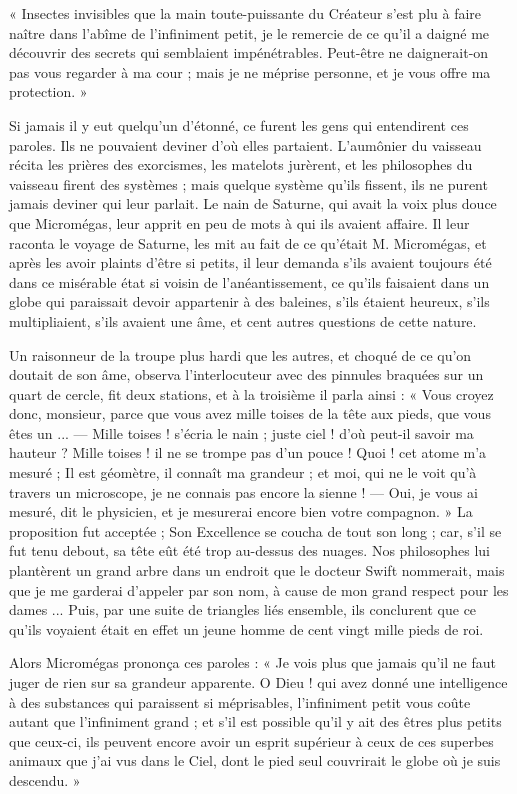 \documentclass[a4paper, 11pt, oneside]{article}
\begin{document}
« Insectes invisibles que la main toute-puissante du Créateur s'est plu à faire naître dans l'abîme de l'infiniment petit, je le remercie de ce qu'il a daigné me découvrir des secrets qui semblaient impénétrables. Peut-être ne daignerait-on pas vous regarder à ma cour ; mais je ne méprise personne, et je vous offre ma protection. »

Si jamais il y eut quelqu'un d'étonné, ce furent les gens qui entendirent ces paroles. Ils ne pouvaient deviner d'où elles partaient. L'aumônier du vaisseau récita les prières des exorcismes, les matelots jurèrent, et les philosophes du vaisseau firent des systèmes ; mais quelque système qu'ils fissent, ils ne purent jamais deviner qui leur parlait. Le nain de Saturne, qui avait la voix plus douce que Micromégas, leur apprit en peu de mots à qui ils avaient affaire. Il leur raconta le voyage de Saturne, les mit au fait de ce qu'était M. Micromégas, et après les avoir plaints d'être si petits, il leur demanda s'ils avaient toujours été dans ce misérable état si voisin de l'anéantissement, ce qu'ils faisaient dans un globe qui paraissait devoir appartenir à des baleines, s'ils étaient heureux, s'ils multipliaient, s'ils avaient une âme, et cent autres questions de cette nature.

Un raisonneur de la troupe plus hardi que les autres, et choqué de ce qu'on doutait de son âme, observa l'interlocuteur avec des pinnules braquées sur un quart de cercle, fit deux stations, et à la troisième il parla ainsi : « Vous croyez donc, monsieur, parce que vous avez mille toises de la tête aux pieds, que vous êtes un ... --- Mille toises ! s'écria le nain ; juste ciel ! d'où peut-il savoir ma hauteur ? Mille toises ! il ne se trompe pas d'un pouce ! Quoi ! cet atome m'a mesuré ; Il est géomètre, il connaît ma grandeur ; et moi, qui ne le voit qu'à travers un microscope, je ne connais pas encore la sienne ! --- Oui, je vous ai mesuré, dit le physicien, et je mesurerai encore bien votre compagnon. » La proposition fut acceptée ; Son Excellence se coucha de tout son long ; car, s'il se fut tenu debout, sa tête eût été trop au-dessus des nuages. Nos philosophes lui plantèrent un grand arbre dans un endroit que le docteur Swift nommerait, mais que je me garderai d'appeler par son nom, à cause de mon grand respect pour les dames ... Puis, par une suite de triangles liés ensemble, ils conclurent que ce qu'ils voyaient était en effet un jeune homme de cent vingt mille pieds de roi.

Alors Micromégas prononça ces paroles : « Je vois plus que jamais qu'il ne faut juger de rien sur sa grandeur apparente. O Dieu ! qui avez donné une intelligence à des substances qui paraissent si méprisables, l'infiniment petit vous coûte autant que l'infiniment grand ; et s'il est possible qu'il y ait des êtres plus petits que ceux-ci, ils peuvent encore avoir un esprit supérieur à ceux de ces superbes animaux que j'ai vus dans le Ciel, dont le pied seul couvrirait le globe où je suis descendu. »
\end{document}
